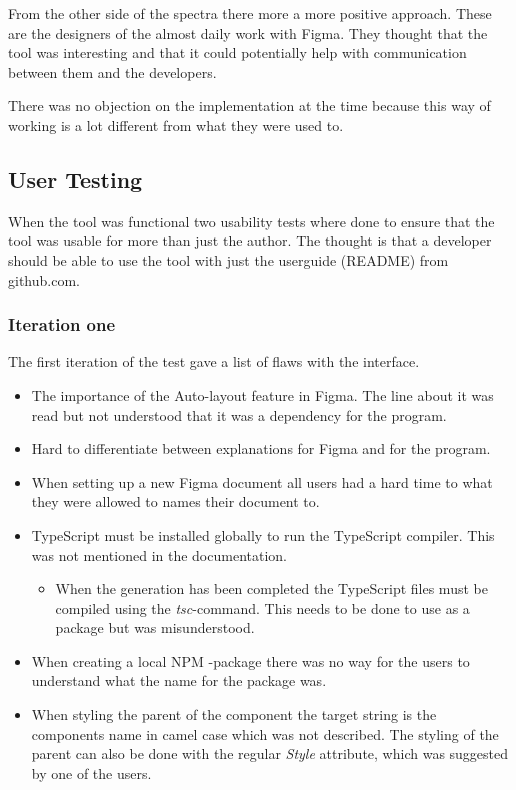 From the other side of the  spectra there more a more positive approach. These are the designers of the almost daily work with Figma. They thought that the tool was interesting and that it could potentially help with communication between them and the developers.

There was no objection on the implementation at the time because this way of working is a lot different from what they were used to.  


\subsection{User Testing}%
\label{sub:User Testing}
When the tool was functional two usability tests where done to ensure that the tool was usable for more than just the author. The thought is that a developer should be able to use the tool with just the userguide (README) from github.com.

\subsubsection{Iteration one}%
\label{ssub:Iteration one}
The first iteration of the test gave a list of flaws with the interface.
\begin{itemize}
   \item The importance of the Auto-layout feature in Figma. The line about it was read but not understood that it was a dependency for the program. 
   \item Hard to differentiate between explanations for Figma and for the program.
   \item When setting up a new Figma document all users had a hard time to what they were allowed to names their document to.
   \item TypeScript must be installed globally to run the TypeScript compiler. This was not mentioned in the documentation. 
      \begin{itemize}
         \item When the generation has been completed the TypeScript files must be compiled using the \textit{tsc}-command. This needs to be done to use as a package but was misunderstood.
      \end{itemize}
   \item When creating a local NPM -package there was no way for the users to understand what the name for the package was. 
   \item When styling the parent of the component the target string is the components name in camel case which was not described. The styling of the parent can also be done with the regular \textit{Style} attribute, which was suggested by one of the users.
\end{itemize}

